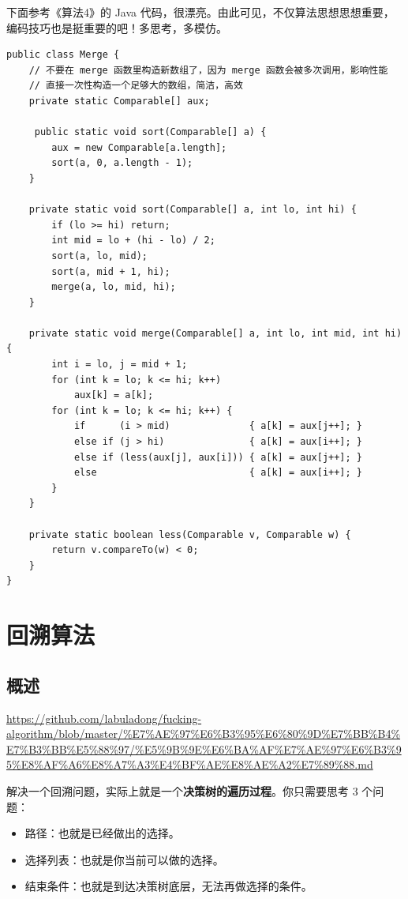 \documentclass[12pt]{article}
\begin{document}
下面参考《算法4》的 Java 代码，很漂亮。由此可见，不仅算法思想思想重要，编码技巧也是挺重要的吧！多思考，多模仿。
\begin{lstlisting}
public class Merge {
    // 不要在 merge 函数里构造新数组了，因为 merge 函数会被多次调用，影响性能
    // 直接一次性构造一个足够大的数组，简洁，高效
    private static Comparable[] aux;

     public static void sort(Comparable[] a) {
        aux = new Comparable[a.length];
        sort(a, 0, a.length - 1);
    }

    private static void sort(Comparable[] a, int lo, int hi) {
        if (lo >= hi) return;
        int mid = lo + (hi - lo) / 2;
        sort(a, lo, mid);
        sort(a, mid + 1, hi);
        merge(a, lo, mid, hi);
    }

    private static void merge(Comparable[] a, int lo, int mid, int hi) {
        int i = lo, j = mid + 1;
        for (int k = lo; k <= hi; k++)
            aux[k] = a[k];
        for (int k = lo; k <= hi; k++) {
            if      (i > mid)              { a[k] = aux[j++]; }
            else if (j > hi)               { a[k] = aux[i++]; }
            else if (less(aux[j], aux[i])) { a[k] = aux[j++]; }
            else                           { a[k] = aux[i++]; }
        }
    }

    private static boolean less(Comparable v, Comparable w) {
        return v.compareTo(w) < 0;
    }
}
\end{lstlisting}










\section{回溯算法}
\subsection{概述}
\url{https://github.com/labuladong/fucking-algorithm/blob/master/%E7%AE%97%E6%B3%95%E6%80%9D%E7%BB%B4%E7%B3%BB%E5%88%97/%E5%9B%9E%E6%BA%AF%E7%AE%97%E6%B3%95%E8%AF%A6%E8%A7%A3%E4%BF%AE%E8%AE%A2%E7%89%88.md}

解决一个回溯问题，实际上就是一个\textbf{决策树的遍历过程}。你只需要思考 3 个问题：
\begin{itemize}
\setlength{\itemsep}{0pt}
\setlength{\parsep}{0pt}
\setlength{\parskip}{0pt}
    \item 路径：也就是已经做出的选择。
    \item 选择列表：也就是你当前可以做的选择。
    \item 结束条件：也就是到达决策树底层，无法再做选择的条件。
\end{itemize}
\end{document}
